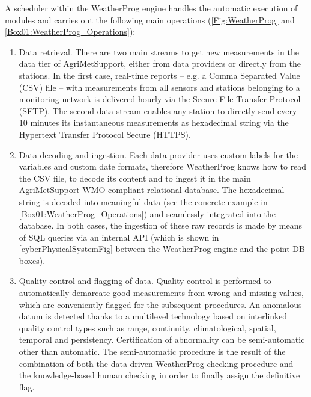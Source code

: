 \documentclass[authoryear,preprint,review,12pt]{elsarticle}
\begin{document}
A scheduler within the WeatherProg engine handles the automatic execution of modules and carries out the following main operations (\cref{Fig:WeatherProg} and \cref{Box01:WeatherProg_Operations}):
\begin{enumerate}
    \item Data retrieval. There are two main streams to get new measurements in the data tier of Agri\-Met\-Support, either from data providers or directly from the stations. 
    In the first case, real-time reports -- e.g. a Comma Separated Value (CSV) file -- with measurements from all sensors and stations belonging to a monitoring network is delivered hourly via the Secure File Transfer Protocol (SFTP).
    The second data stream enables any station to directly send every 10 minutes its instantaneous measurements as hexadecimal string via the Hypertext Transfer Protocol Secure (HTTPS).
    
    \item Data decoding and ingestion. Each data provider uses custom labels for the variables and custom date formats, therefore WeatherProg knows how to read the CSV file, to decode its content and to ingest it in the main Agri\-Met\-Support WMO-compliant relational database. 
    The hexadecimal string is decoded into meaningful data (see the concrete example in \cref{Box01:WeatherProg_Operations}) and seamlessly integrated into the database.
    In both cases, the ingestion of these raw records is made by means of SQL queries via an internal API (which is shown in \cref{cyberPhysicalSystemFig} between the WeatherProg engine and the point DB boxes).

    \item Quality control and flagging of data. Quality control is performed to automatically demarcate good measurements from wrong and missing values, which are conveniently flagged for the subsequent procedures.
    An anomalous datum is detected thanks to a multilevel technology based on interlinked quality control types such as range, continuity, climatological, spatial, temporal and persistency.
    Certification of abnormality can be semi-automatic other than automatic.
    The semi-automatic procedure is the result of the combination of both the data-driven WeatherProg checking procedure and the knowledge-based human checking in order to finally assign the definitive flag.
 

\end{enumerate}
\end{document}
